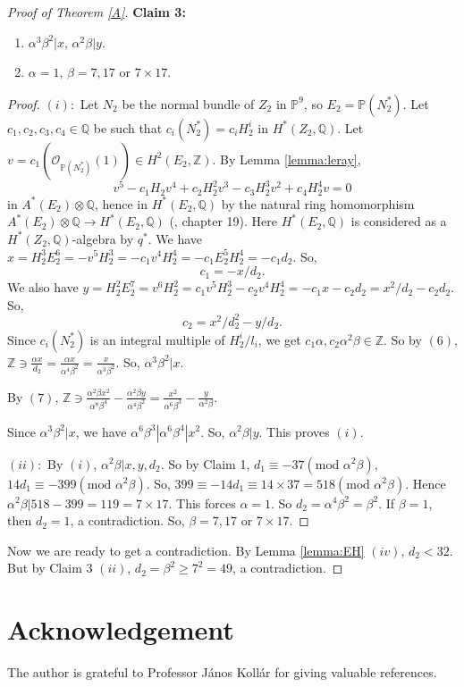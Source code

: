 \documentclass{article}
\begin{document}
\begin{proof}[Proof of Theorem \ref{A}]
 \textbf{Claim 3:} \begin{enumerate}
     \item [(i)] $\alpha^3\beta^2|x$, $\alpha^2\beta|y$.
     \item [(ii)] $\alpha=1$, $\beta=7,17$ or $7\times 17$.
 \end{enumerate}
 \begin{proof}
     $(i):$ Let $N_2$ be the normal bundle of $Z_2$ in $\mathbb{P}^9$, so $E_2=\mathbb{P}(N_2^*)$. Let $c_1,c_2,c_3,c_4\in \mathbb{Q}$ be such that $c_i(N_2^*)=c_iH_2^i$ in $H^*(Z_2,\mathbb{Q})$.  Let $v=c_1(\mathcal{O}_{\mathbb{P}(N_2^*)}(1))\in H^2(E_2,\mathbb{Z})$. By Lemma \ref{lemma:leray}, $$v^5-c_1H_2v^4+c_2H_2^2v^3-c_3H_2^3v^2+c_4H_2^4v=0$$ in $A^*(E_2)\otimes \mathbb{Q}$, hence in $H^*(E_2,\mathbb{Q}) $ by the natural ring homomorphism $A^*(E_2)\otimes \mathbb{Q} \to H^*(E_2,\mathbb{Q}) $ (\cite{fulton2013intersection}, chapter 19). Here $H^*(E_2,\mathbb{Q})$ is considered as a $H^*(Z_2,\mathbb{Q})$-algebra by $q^*$. We have $x=H_2^3E_2^6=-v^5H_2^3=-c_1v^4H_2^4=-c_1E_2^5H_2^4=-c_1d_2$. So, 
     \begin{equation}
         c_1=-x/d_2.
     \end{equation}
     We also have $y=H_2^2E_2^7=v^6H_2^2=c_1v^5H_2^3-c_2v^4H_2^4=-c_1x-c_2d_2=x^2/d_2-c_2d_2.$ So,
     \begin{equation}
         c_2=x^2/d_2^2-y/d_2.
     \end{equation}
     Since $c_i(N_2^*)$ is an integral multiple of $H_2^i/l_i$, we get $c_1\alpha, c_2\alpha^2\beta\in\mathbb{Z}$. So by $(6)$, $\mathbb{Z}\ni \frac{\alpha x}{d_2}=\frac{\alpha x}{\alpha^4\beta^2}=\frac{x}{\alpha^3\beta^2} $. So, $\alpha^3\beta^2|x.$
     
     By $(7)$, $\mathbb{Z}\ni \frac{\alpha^2\beta x^2}{\alpha^8\beta^4}-\frac{\alpha^2\beta y}{\alpha^4\beta^2}=\frac{x^2}{\alpha^6\beta^3}-\frac{y}{\alpha^2\beta}$.

     Since $\alpha^3\beta^2|x$, we have $\alpha^6\beta^3|\alpha^6\beta^4|x^2$. So, $\alpha^2\beta|y$. This proves $(i)$.

     $(ii):$ By $(i)$, $\alpha^2\beta|x,y,d_2$. So by Claim 1, $d_1\equiv -37(\text{mod } \alpha^2\beta)$, $14d_1\equiv-399(\text{mod } \alpha^2\beta)$. So, $399\equiv-14d_1\equiv 14\times 37=518(\text{mod } \alpha^2\beta) $. Hence $\alpha^2\beta|518-399=119=7\times 17$. This forces $\alpha=1$. So $d_2=\alpha^4\beta^2=\beta^2$. If $\beta=1$, then $d_2=1$, a contradiction. So, $\beta=7,17$ or $7\times 17$.
 \end{proof}

 Now we are ready to get a contradiction. By Lemma \ref{lemma:EH} $(iv)$, $d_2<32$. But by Claim 3 $(ii)$, $d_2=\beta^2\geq 7^2=49$, a contradiction.
\end{proof}
\section{Acknowledgement}
The author is grateful to Professor János Kollár for giving valuable references.

\printbibliography
\end{document}
